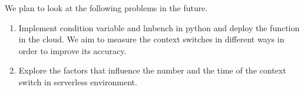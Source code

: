 We plan to look at the following problems in the future.
\begin{enumerate}
    \item Implement condition variable and lmbench in python and deploy the function in the cloud.
    We aim to measure the context switches in different ways in order to improve its accuracy.
    \item Explore the factors that influence the number and the time of the context switch in serverless environment.
\end{enumerate}
